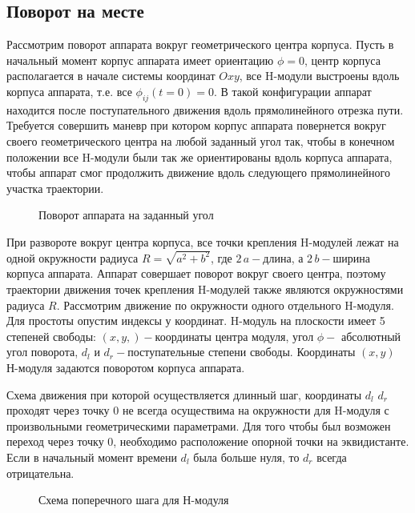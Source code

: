 \subsection{Поворот на месте}
Рассмотрим поворот аппарата вокруг геометрического центра корпуса. Пусть в начальный момент корпус аппарата имеет ориентацию $\phi=0$, центр корпуса располагается в начале системы координат $Oxy$, все H-модули выстроены вдоль корпуса аппарата, т.е. все $\phi_{ij}(t = 0)=0$. В такой конфигурации аппарат находится после поступательного движения вдоль прямолинейного отрезка пути. Требуется совершить маневр при котором корпус аппарата повернется вокруг своего геометрического центра на любой заданный угол так, чтобы в конечном положении все H-модули были так же ориентированы вдоль корпуса аппарата, чтобы аппарат смог продолжить движение вдоль следующего прямолинейного участка траектории.

\begin{figure}[h]
\caption{Поворот аппарата на заданный угол}
\end{figure}

При развороте вокруг центра корпуса, все точки крепления H-модулей лежат на одной окружности радиуса $R = \sqrt{a^2+b^2}$, где $2\,a - $длина, а $2\,b - $ширина корпуса аппарата. Аппарат совершает поворот вокруг своего центра, поэтому траектории движения точек крепления H-модулей также являются окружностями радиуса $R$. Рассмотрим движение по окружности одного отдельного H-модуля. Для простоты опустим индексы у координат. H-модуль на плоскости имеет 5 степеней свободы: $(x,y,)-$координаты центра модуля, угол $\phi-$ абсолютный угол поворота, $d_l$ и $d_r - $поступательные степени свободы. Координаты $(x,y)$ Н-модуля задаются поворотом корпуса аппарата.

Схема движения при которой осуществляется длинный шаг, координаты $d_l$ $d_r$ проходят через точку 0 не всегда осуществима на окружности для H-модуля с произвольными геометрическими параметрами. Для того чтобы был возможен переход через точку 0, необходимо расположение опорной точки на эквидистанте. Если в начальный момент времени $d_l$ была больше нуля, то $d_r$ всегда отрицательна. 


\begin{figure}[!h]
\begin{minipage}{0.49\linewidth}
\end{minipage}
\begin{minipage}{0.49\linewidth}
\end{minipage}
\caption{Схема поперечного шага для Н-модуля}
\label{lateral_step}
\end{figure}



